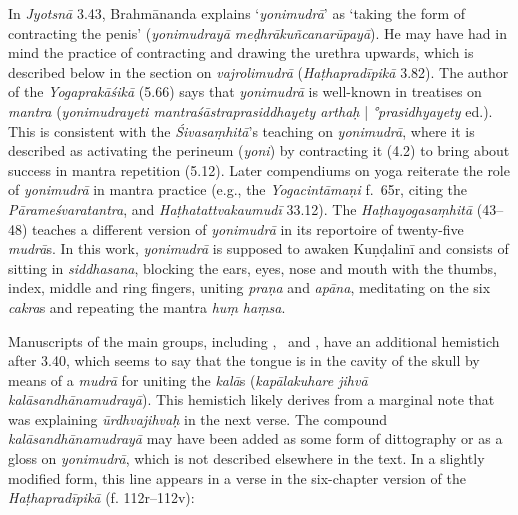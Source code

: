 \begin{ekdosis}
\begin{philcomm}[hp03_040]
%



In \emph{Jyotsnā} 3.43, Brahmānanda explains `\emph{yonimudrā}' as `taking the form of contracting the penis' (\emph{yonimudrayā meḍhrākuñcanarūpayā}). He may have had in mind the practice of contracting and drawing the urethra upwards, which is described below in the section on \emph{vajrolimudrā} (\emph{Haṭhapradīpikā} 3.82). The author of the \emph{Yogaprakāśikā} (5.66) says that \emph{yonimudrā} is well-known in treatises on \emph{mantra} (\emph{yonimudrayeti mantraśāstraprasiddhayety arthaḥ} | \emph{°prasidhyayety} ed.). This is consistent with the \emph{Śivasaṃhitā}'s teaching on \emph{yonimudrā}, where it is described as activating the perineum (\emph{yoni}) by contracting it (4.2) to bring about success in mantra repetition (5.12). Later compendiums on yoga reiterate the role of \emph{yonimudrā} in mantra practice (e.g., the \emph{Yogacintāmaṇi} f.~65r, citing the \emph{Pārameśvaratantra}, and \emph{Haṭhatattvakaumudī} 33.12). The \emph{Haṭhayogasaṃhitā} (43–48) teaches a different version of \emph{yonimudrā} in its reportoire of twenty-five \emph{mudrā}s. In this work, \emph{yonimudrā} is supposed to awaken Kuṇḍalinī and consists of sitting in \emph{siddhasana}, blocking the ears, eyes, nose and mouth with the thumbs, index, middle and ring fingers, uniting \emph{praṇa} and \emph{apāna}, meditating on the six \emph{cakra}s and repeating the mantra \emph{huṃ haṃsa}. 

Manuscripts of the main groups, including \textalpha, \textbeta\ and \textgamma, have an additional hemistich after 3.40, which seems to say that the tongue is in the cavity of the skull by means of a \emph{mudrā} for uniting the \emph{kalā}s (\emph{kapālakuhare jihvā kalāsandhānamudrayā}). This hemistich likely derives from a marginal note that was explaining \emph{ūrdhvajihvaḥ} in the next verse. The compound \emph{kalāsandhānamudrayā} may have been added as some form of dittography or as a gloss on \emph{yonimudrā}, which is not described elsewhere in the text. In a slightly modified form, this line appears in a verse in the six-chapter version of the \emph{Haṭhapradīpikā} (f. 112r–112v):


\end{philcomm}
\end{ekdosis}

